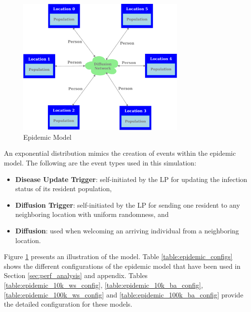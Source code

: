 \documentclass[11pt]{book}
\begin{document}
\begin{figure}
  \centering
  \includegraphics[width=0.75\textwidth]{figures/epidemic.pdf}
  \caption{Epidemic Model}\label{fig:epidemic}
\end{figure}

\noindent
An exponential distribution mimics the creation of events within the epidemic model.  The following are the
event types used in this simulation:

\begin{itemize}
\item \textbf{Disease Update Trigger}: self-initiated by the LP for updating the infection status of its
  resident population,
\item \textbf{Diffusion Trigger}: self-initiated by the LP for sending one resident to any neighboring
  location with uniform randomness, and
\item \textbf{Diffusion}: used when welcoming an arriving individual from a neighboring location.
\end{itemize}

Figure \ref{fig:epidemic} presents an illustration of the model.  Table \ref{table:epidemic_configs} shows the
different configurations of the epidemic model that have been used in Section \ref{sec:perf_analysis} and
appendix. Tables \ref{table:epidemic_10k_ws_config}, \ref{table:epidemic_10k_ba_config},
\ref{table:epidemic_100k_ws_config} and \ref{table:epidemic_100k_ba_config} provide the detailed configuration
for these models.
\end{document}

